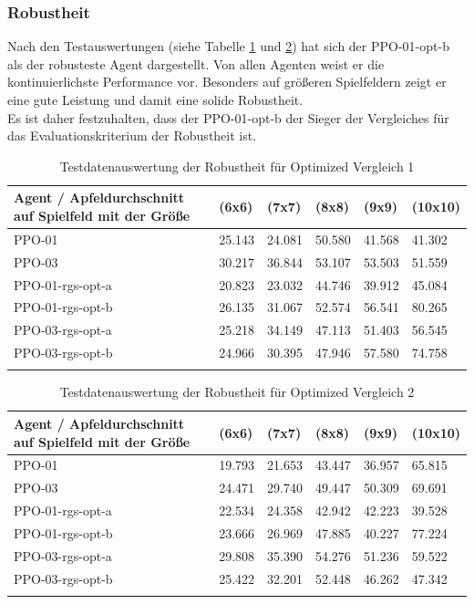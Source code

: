 \subsubsection{Robustheit}
Nach den Testauswertungen (siehe Tabelle \ref{tab:Evaluation_Testdaten_Robustheit_1_Optimized} und \ref{tab:Evaluation_Testdaten_Robustheit_2_Optimized}) hat sich der PPO-01-opt-b als der robusteste Agent dargestellt. Von allen Agenten weist er die kontinuierlichste Performance vor. Besonders auf größeren Spielfeldern zeigt er eine gute Leistung und damit eine solide Robustheit.\\
Es ist daher festzuhalten, dass der PPO-01-opt-b der Sieger der Vergleiches für das Evaluationskriterium der Robustheit ist.
\begin{longtable}[h]{|p{4.8cm}|p{1.5cm}|p{1.5cm}|p{1.5cm}|p{1.5cm}|p{1.5cm}|}
	\hline
	Agent / Apfeldurchschnitt auf Spielfeld mit der Größe & (6x6) & (7x7) & (8x8) & (9x9) & (10x10) \\
		\hline
	PPO-01 & 25.143 & 24.081 & 50.580 & 41.568 & 41.302 \\
	\hline
	PPO-03 & 30.217 & 36.844 & 53.107 & 53.503 & 51.559 \\
	\hline
	PPO-01-rgs-opt-a & 20.823 & 23.032 & 44.746 & 39.912 & 45.084 \\
	\hline
	PPO-01-rgs-opt-b & 26.135 & 31.067 & 52.574 & 56.541 & 80.265 \\
	\hline
	PPO-03-rgs-opt-a & 25.218 & 34.149 & 47.113 & 51.403 & 56.545 \\
	\hline
	PPO-03-rgs-opt-b & 24.966 & 30.395 & 47.946 & 57.580 & 74.758 \\
	\hline
	\caption{Testdatenauswertung der Robustheit für Optimized Vergleich 1}
	\label{tab:Evaluation_Testdaten_Robustheit_1_Optimized} 
\end{longtable}
\begin{longtable}[h]{|p{4.8cm}|p{1.5cm}|p{1.5cm}|p{1.5cm}|p{1.5cm}|p{1.5cm}|}
	\hline
	Agent / Apfeldurchschnitt auf Spielfeld mit der Größe & (6x6) & (7x7) & (8x8) & (9x9) & (10x10) \\
	\hline
	PPO-01 & 19.793 & 21.653 & 43.447 & 36.957 & 65.815 \\
	\hline
	PPO-03 & 24.471 & 29.740 & 49.447 & 50.309 & 69.691 \\
	\hline
	PPO-01-rgs-opt-a & 22.534 & 24.358 & 42.942 & 42.223 & 39.528 \\
	\hline
	PPO-01-rgs-opt-b & 23.666 & 26.969 & 47.885 & 40.227 & 77.224 \\
	\hline
	PPO-03-rgs-opt-a & 29.808 & 35.390 & 54.276 & 51.236 & 59.522 \\
	\hline
	PPO-03-rgs-opt-b & 25.422 & 32.201 & 52.448 & 46.262 & 47.342 \\
	\hline
	\caption{Testdatenauswertung der Robustheit für Optimized Vergleich 2}
	\label{tab:Evaluation_Testdaten_Robustheit_2_Optimized} 
\end{longtable}

